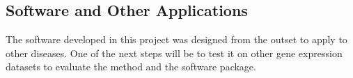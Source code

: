 \subsection*{Software and Other Applications}

The software developed in this project was designed from the outset to apply to other diseases. One of the next steps will be to test it on other gene expression datasets to evaluate the method and the software package.


 
